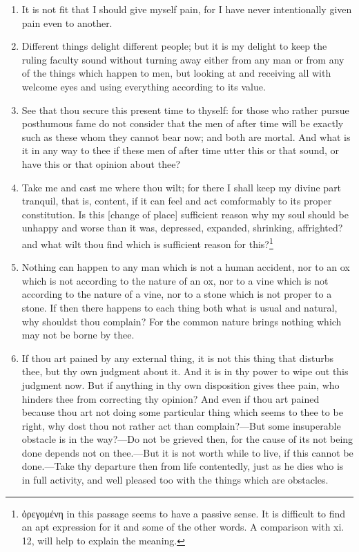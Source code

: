 \begin{enumerate}
\item It is not fit that I should give myself pain, for I have never intentionally given pain even to another.

\item Different things delight different people; but it is my delight to keep the ruling faculty sound without turning away either from any man or from any of the things which happen to men, but looking at and receiving all with welcome eyes and using everything according to its value.

\item See that thou secure this present time to thyself: for those who rather pursue posthumous fame do not consider that the men of after time will be exactly such as these whom they cannot bear now; and both are mortal. And what is it in any way to thee if these men of after time utter this or that sound, or have this or that opinion about thee?

\item Take me and cast me where thou wilt; for there I shall keep my divine part tranquil, that is, content, if it can feel and act comformably to its proper constitution. Is this [{\clarify change of place}] sufficient reason why my soul should be unhappy and worse than it was, depressed, expanded, shrinking, affrighted? and what wilt thou find which is sufficient reason for this?\footnote{\textgreek{ὀρεγομένη} in this passage seems to have a passive sense. It is difficult to find an apt expression for it and some of the other words. A comparison with xi. 12, will help to explain the meaning.}

\item Nothing can happen to any man which is not a human accident, nor to an ox which is not according to the nature of an ox, nor to a vine which is not according to the nature of a vine, nor to a stone which is not proper to a stone. If then there happens to each thing both what is usual and natural, why shouldst thou complain? For the common nature brings nothing which may not be borne by thee.

\item If thou art pained by any external thing, it is not this thing that disturbs thee, but thy own judgment about it. And it is in thy power to wipe out this judgment now. But if anything in thy own disposition gives thee pain, who hinders thee from correcting thy opinion? And even if thou art pained because thou art not doing some particular thing which seems to thee to be right, why dost thou not rather act than complain?—But some insuperable obstacle is in the way?—Do not be grieved then, for the cause of its not being done depends not on thee.—But it is not worth while to live, if this cannot be done.—Take thy departure then from life contentedly, just as he dies who is in full activity, and well pleased too with the things which are obstacles.


\end{enumerate}
